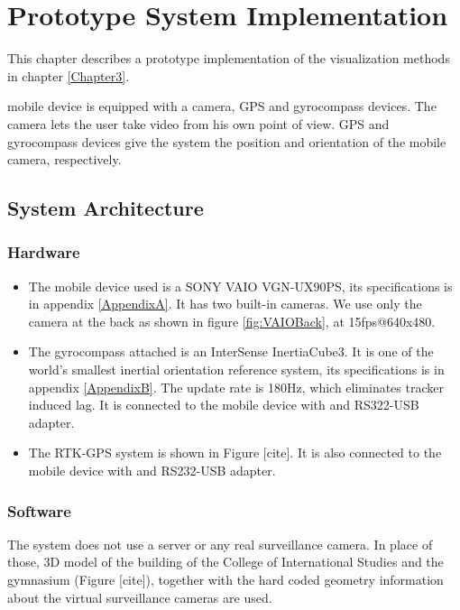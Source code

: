 \chapter{Prototype System Implementation}
\label{Chapter4}

This chapter describes a prototype implementation of the visualization methods in chapter \ref{Chapter3}.

mobile device is equipped with a camera, GPS and gyrocompass devices. The camera lets the user take video from his own point of view. GPS and gyrocompass devices give the system the position and orientation of the mobile camera, respectively.


\section{System Architecture}

\subsection{Hardware}

\begin{itemize}
	\item The mobile device used is a SONY VAIO VGN-UX90PS, its specifications is in appendix \ref{AppendixA}. It has two built-in cameras. We use only the camera at the back as shown in figure \ref{fig:VAIOBack}, at 15fps@640x480.
	\item The gyrocompass attached is an InterSense InertiaCube3. It is one of the world's smallest inertial orientation reference system, its specifications is in appendix \ref{AppendixB}. The update rate is 180Hz, which eliminates tracker induced lag. It is connected to the mobile device with and RS322-USB adapter.
	\item The RTK-GPS system is shown in Figure [cite]. It is also connected to the mobile device with and RS232-USB adapter.
\end{itemize}

\subsection{Software}

The system does not use a server or any real surveillance camera. In place of those, 3D model of the building of the College of International Studies and the gymnasium (Figure [cite]), together with the hard coded geometry information about the virtual surveillance cameras are used.

